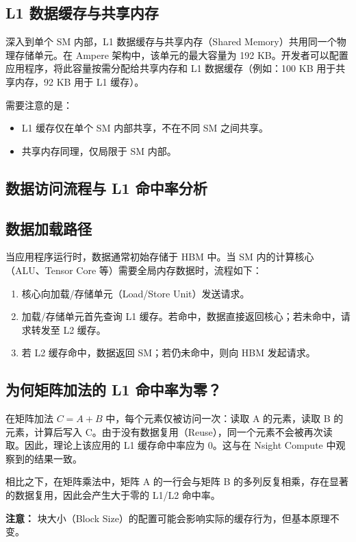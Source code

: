 \subsection{L1 数据缓存与共享内存}
深入到单个 SM 内部，L1 数据缓存与共享内存（Shared Memory）共用同一个物理存储单元。在 Ampere 架构中，该单元的最大容量为 192 KB。开发者可以配置应用程序，将此容量按需分配给共享内存和 L1 数据缓存（例如：100 KB 用于共享内存，92 KB 用于 L1 缓存）。

需要注意的是：
\begin{itemize}
    \item L1 缓存仅在单个 SM 内部共享，不在不同 SM 之间共享。
    \item 共享内存同理，仅局限于 SM 内部。
\end{itemize}

\subsection{数据访问流程与 L1 命中率分析}

\subsection{数据加载路径}
当应用程序运行时，数据通常初始存储于 HBM 中。当 SM 内的计算核心（ALU、Tensor Core 等）需要全局内存数据时，流程如下：
\begin{enumerate}
    \item 核心向加载/存储单元（Load/Store Unit）发送请求。
    \item 加载/存储单元首先查询 L1 缓存。若命中，数据直接返回核心；若未命中，请求转发至 L2 缓存。
    \item 若 L2 缓存命中，数据返回 SM；若仍未命中，则向 HBM 发起请求。
\end{enumerate}

\subsection{为何矩阵加法的 L1 命中率为零？}
在矩阵加法 $C = A + B$ 中，每个元素仅被访问一次：读取 A 的元素，读取 B 的元素，计算后写入 C。由于没有数据复用（Reuse），同一个元素不会被再次读取。因此，理论上该应用的 L1 缓存命中率应为 0。这与在 Nsight Compute 中观察到的结果一致。

相比之下，在矩阵乘法中，矩阵 A 的一行会与矩阵 B 的多列反复相乘，存在显著的数据复用，因此会产生大于零的 L1/L2 命中率。

\textbf{注意：} 块大小（Block Size）的配置可能会影响实际的缓存行为，但基本原理不变。


